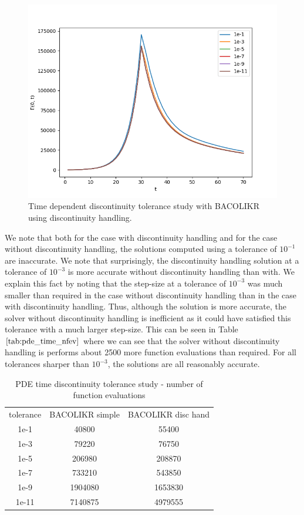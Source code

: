\documentclass{article}
\begin{document}
\begin{figure}[H]
\centering
\includegraphics[width=0.7\linewidth]{./figures/pde_time_disc_bacolikr_disc_hand_tol}
\caption{Time dependent discontinuity tolerance study with BACOLIKR using discontinuity handling.}
\label{fig:pde_time_disc_bacolikr_disc_hand_tol}
\end{figure}

We note that both for the case with discontinuity handling and for the case without discontinuity handling, the solutions computed using a tolerance of $10^{-1}$ are inaccurate. We note that surprisingly, the discontinuity handling solution at a tolerance of $10^{-3}$ is more accurate without discontinuity handling than with. We explain this fact by noting that the step-size at a tolerance of $10^{-3}$ was much smaller than required in the case without discontinuity handling than in the case with discontinuity handling. Thus, although the solution is more accurate, the solver without discontinuity handling is inefficient as it could have satisfied this tolerance with a much larger step-size. This can be seen in Table $\ref{tab:pde_time_nfev}$ where we can see that the solver without discontinuity handling is performs about 2500 more function evaluations than required. For all tolerances sharper than $10^{-3}$, the solutions are all reasonably accurate.

\begin{table}[h]
\caption {PDE time discontinuity tolerance study - number of function evaluations} 
\label{tab:pde_time_nfev}
\begin{center}
\begin{tabular}{ c c c } 
tolerance & BACOLIKR simple  & BACOLIKR disc hand \\ 
1e-1      &   40800         &   55400 \\
1e-3      &   79220         &   76750 \\
1e-5      &  206980         &  208870 \\
1e-7      &  733210         &  543850 \\
1e-9      & 1904080         & 1653830 \\
1e-11     & 7140875         & 4979555 \\
\end{tabular}
\end{center}
\end{table}
\end{document}
